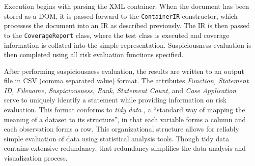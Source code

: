 Execution begins with parsing the XML container.  When the document has been stored as a DOM, it is
passed forward to the \texttt{ContainerIR} constructor, which processes the document into an IR as
described previously.  The IR is then passed to the \texttt{CoverageReport} class, where the 
test class is executed and coverage information is collated into the simple representation.
Suspiciousness evaluation is then completed using all risk evaluation functions specified.

After performing suspiciousness evaluation, the results are written to an output file in CSV (comma
separated value) format.  The attributes \textit{Function, Statement ID, Filename, Suspiciousness, Rank,
Statement Count,}
and \textit{Case Application} serve to uniquely identify a statement while providing information on risk evaluation.  
This format conforms to \textit{tidy data}  \cite{tidy}, a ``standard way of mapping the meaning of a 
dataset to its structure'', in that each variable forms a column and each observation forms a row.  
This organizational structure allows for reliably simple evaluation of data using statistical 
analysis tools.  Though tidy data contains extensive redundancy, that redundancy simplifies
the data analysis and visualization process.

